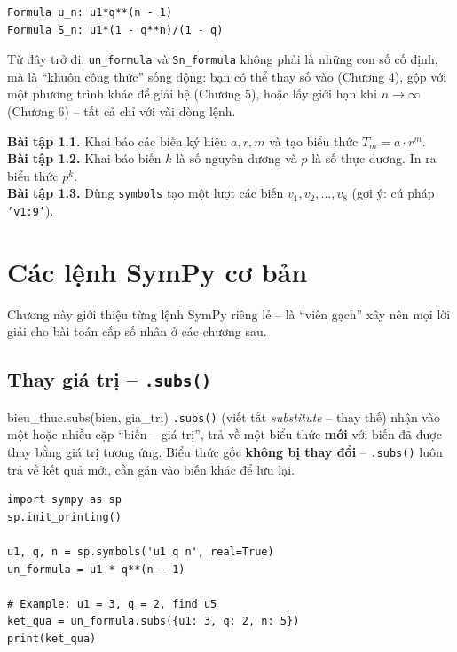 \documentclass[12pt,a4paper]{report}
\begin{document}
\begin{lstlisting}[style=outstyle,caption={Kết quả in ra}]
Formula u_n: u1*q**(n - 1)
Formula S_n: u1*(1 - q**n)/(1 - q)
\end{lstlisting}

\begin{tipbox}
Từ đây trở đi, \texttt{un\_formula} và \texttt{Sn\_formula} không phải
là những con số cố định, mà là ``khuôn công thức'' sống động: bạn có
thể thay số vào (Chương 4), gộp với một phương trình khác để giải hệ
(Chương 5), hoặc lấy giới hạn khi $n \to \infty$ (Chương 6) -- tất cả
chỉ với vài dòng lệnh.
\end{tipbox}

\begin{exbox}
\textbf{Bài tập 1.1.} Khai báo các biến ký hiệu $a, r, m$ và tạo biểu
thức $T_m = a \cdot r^m$.\\[2pt]
\textbf{Bài tập 1.2.} Khai báo biến $k$ là số nguyên dương và $p$ là số
thực dương. In ra biểu thức $p^k$.\\[2pt]
\textbf{Bài tập 1.3.} Dùng \texttt{symbols} tạo một lượt các biến
$v_1, v_2, \ldots, v_8$ (gợi ý: cú pháp \texttt{'v1:9'}).
\end{exbox}

\newpage

\chapter{Các lệnh SymPy cơ bản}

Chương này giới thiệu từng lệnh SymPy riêng lẻ -- là ``viên gạch'' xây
nên mọi lời giải cho bài toán cấp số nhân ở các chương sau.

\section{Thay giá trị -- \texttt{.subs()}}

\begin{syntaxbox}{bieu\_thuc.subs(bien, gia\_tri)}
\texttt{.subs()} (viết tắt \emph{substitute} -- thay thế) nhận vào một
hoặc nhiều cặp ``biến -- giá trị'', trả về một biểu thức \textbf{mới}
với biến đã được thay bằng giá trị tương ứng. Biểu thức gốc \textbf{không
bị thay đổi} -- \texttt{.subs()} luôn trả về kết quả mới, cần gán vào
biến khác để lưu lại.
\end{syntaxbox}

\begin{lstlisting}[caption={Thay số cho nhiều biến cùng lúc}]
import sympy as sp
sp.init_printing()

u1, q, n = sp.symbols('u1 q n', real=True)
un_formula = u1 * q**(n - 1)

# Example: u1 = 3, q = 2, find u5
ket_qua = un_formula.subs({u1: 3, q: 2, n: 5})
print(ket_qua)
\end{lstlisting}
\end{document}
